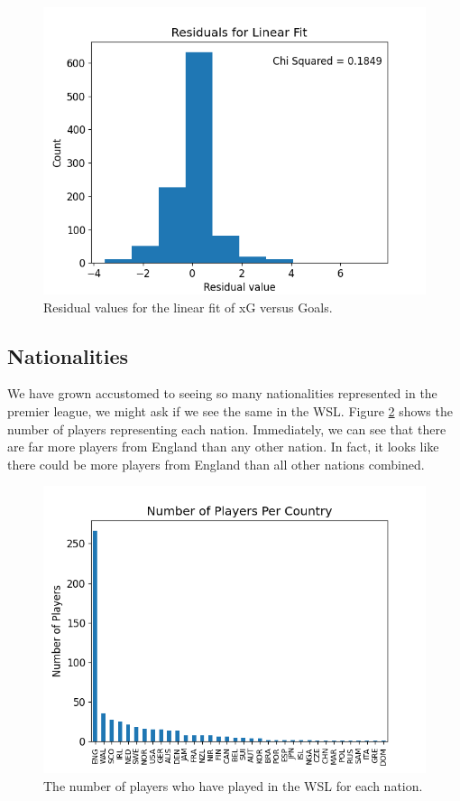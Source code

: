 \documentclass[12pt, a4paper, twocolumn]{article}
\begin{document}
\begin{figure}
  \includegraphics[width=\linewidth]{../vis/playerStats/goals_v_xg_residuals.png}
  \caption{Residual values for the linear fit of xG versus Goals.}
  \label{res}
\end{figure}

\subsection{Nationalities}

We have grown accustomed to seeing so many nationalities represented in the premier league, we might ask if we see the same in the WSL. Figure \ref{nation_bar} shows the number of players representing each nation. Immediately, we can see that there are far more players from England than any other nation. In fact, it looks like there could be more players from England than all other nations combined.

\begin{figure}
  \includegraphics[width=\linewidth]{../vis/playerStats/nation_bar.png}
  \caption{The number of players who have played in the WSL for each nation.}
  \label{nation_bar}
\end{figure}
\end{document}

